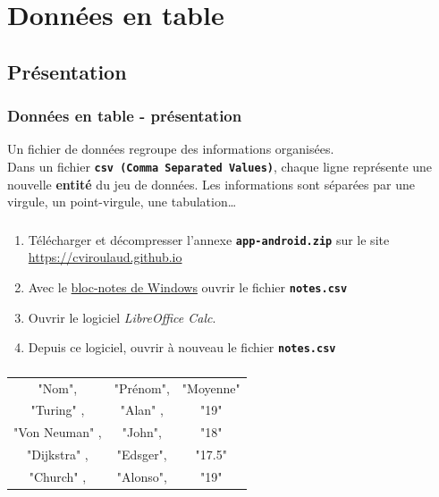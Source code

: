 \documentclass[svgnames,11pt]{beamer}
\begin{document}
\section{Données en table}
\subsection{Présentation}
\begin{frame}
    \frametitle{Données en table - présentation}

    \begin{aretenir}[]
        Un fichier de données regroupe des informations organisées.\\Dans un fichier \textbf{\texttt{csv (Comma Separated Values)}}, chaque ligne représente une nouvelle \textbf{entité} du jeu de données. Les informations sont séparées par une virgule, un point-virgule, une tabulation\dots
    \end{aretenir}

\end{frame}
\begin{frame}
    \frametitle{}

    \begin{activite}
        \begin{enumerate}
            \item Télécharger et décompresser l'annexe \textbf{\texttt{app-android.zip}} sur le site \url{https://cviroulaud.github.io}
            \item Avec le \underline{bloc-notes de Windows} ouvrir le fichier \textbf{\texttt{notes.csv}}
            \item Ouvrir le logiciel \emph{LibreOffice Calc}.
            \item Depuis ce logiciel, ouvrir à nouveau le fichier \textbf{\texttt{notes.csv}}
        \end{enumerate}
    \end{activite}

\end{frame}
\begin{frame}
    \frametitle{}

    \begin{center}
        \begin{tabular}{*{3}{c}}
            \hline
            "Nom",         & "Prénom", & "Moyenne" \\
            "Turing" ,     & "Alan" ,  & "19"      \\
            "Von Neuman" , & "John",   & "18"      \\
            "Dijkstra"  ,  & "Edsger", & "17.5"    \\
            "Church"   ,   & "Alonso", & "19"      \\
            \hline
        \end{tabular}
    \end{center}

\end{frame}
\end{document}
